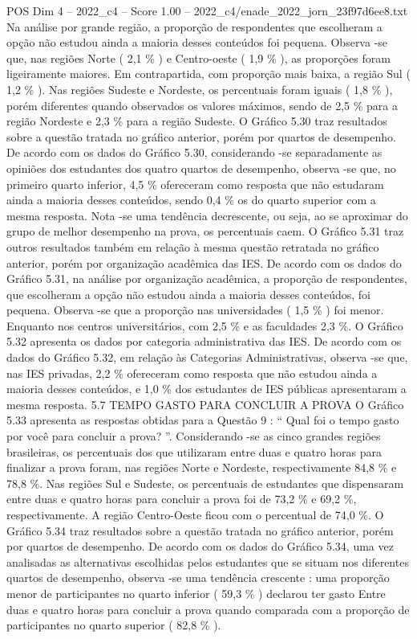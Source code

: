 \begin{textsample}{POS Dim 4 – 2022\_c4 – Score 1.00 – 2022\_c4/enade\_2022\_jorn\_23f97d6ee8.txt}
Na análise por grande região, a proporção de respondentes que escolheram a opção não estudou ainda a maioria desses conteúdos foi pequena.
Observa -se que, nas regiões Norte ( 2,1 \% ) e Centro-oeste ( 1,9 \% ), as proporções foram ligeiramente maiores.
Em contrapartida, com proporção mais baixa, a região Sul ( 1,2 \% ).
Nas regiões Sudeste e Nordeste, os percentuais foram iguais ( 1,8 \% ), porém diferentes quando observados os valores máximos, sendo de 2,5 \% para a região Nordeste e 2,3 \% para a região Sudeste.
O Gráfico 5.30 traz resultados sobre a questão tratada no gráfico anterior, porém por quartos de desempenho.
De acordo com os dados do Gráfico 5.30, considerando -se separadamente as opiniões dos estudantes dos quatro quartos de desempenho, observa -se que, no primeiro quarto inferior, 4,5 \% ofereceram como resposta que não estudaram ainda a maioria desses conteúdos, sendo 0,4 \% os do quarto superior com a mesma resposta.
Nota -se uma tendência decrescente, ou seja, ao se aproximar do grupo de melhor desempenho na prova, os percentuais caem.
O Gráfico 5.31 traz outros resultados também em relação à mesma questão retratada no gráfico anterior, porém por organização acadêmica das IES.
De acordo com os dados do Gráfico 5.31, na análise por organização acadêmica, a proporção de respondentes, que escolheram a opção não estudou ainda a maioria desses conteúdos, foi pequena.
Observa -se que a proporção nas universidades ( 1,5 \% ) foi menor.
Enquanto nos centros universitários, com 2,5 \% e as faculdades 2,3 \%.
O Gráfico 5.32 apresenta os dados por categoria administrativa das IES.
De acordo com os dados do Gráfico 5.32, em relação às Categorias Administrativas, observa -se que, nas IES privadas, 2,2 \% ofereceram como resposta que não estudou ainda a maioria desses conteúdos, e 1,0 \% dos estudantes de IES públicas apresentaram a mesma resposta. 5.7 TEMPO GASTO PARA CONCLUIR A PROVA O Gráfico 5.33 apresenta as respostas obtidas para a Questão 9 : “ Qual foi o tempo gasto por você para concluir a prova? ”.
Considerando -se as cinco grandes regiões brasileiras, os percentuais dos que utilizaram entre duas e quatro horas para finalizar a prova foram, nas regiões Norte e Nordeste, respectivamente 84,8 \% e 78,8 \%.
Nas regiões Sul e Sudeste, os percentuais de estudantes que dispensaram entre duas e quatro horas para concluir a prova foi de 73,2 \% e 69,2 \%, respectivamente.
A região Centro-Oeste ficou com o percentual de 74,0 \%.
O Gráfico 5.34 traz resultados sobre a questão tratada no gráfico anterior, porém por quartos de desempenho.
De acordo com os dados do Gráfico 5.34, uma vez analisadas as alternativas escolhidas pelos estudantes que se situam nos diferentes quartos de desempenho, observa -se uma tendência crescente : uma proporção menor de participantes no quarto inferior ( 59,3 \% ) declarou ter gasto Entre duas e quatro horas para concluir a prova quando comparada com a proporção de participantes no quarto superior ( 82,8 \% ).

\end{textsample}

